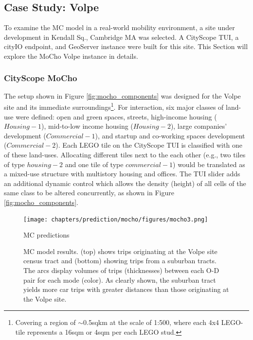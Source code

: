 {    \subsection{Case Study: Volpe}\label{subsec:mocho-volpe}
    {
        To examine the MC model in a real-world mobility environment, a site under development in Kendall Sq., Cambridge MA was selected. A CityScope TUI, a cityIO endpoint, and GeoServer instance were built for this site. This Section will explore the MoCho Volpe instance in details.

        \subsubsection{CityScope MoCho}
        {
            The setup shown in Figure \eqref{fig:mocho_components} was designed for the Volpe site and its immediate surroundings\footnote{Covering a region of $\sim$0.5sqkm at the scale of 1:500, where each 4x4 LEGO-tile represents a 16sqm or 4sqm per each LEGO stud.}. For interaction, six major classes of land-use were defined: open and green spaces, streets, high-income housing ($Housing-1$), mid-to-low income housing ($Housing-2$), large companies' development ($Commercial-1$), and startup and co-working spaces development ($Commercial-2$). Each LEGO tile on the CityScope TUI is classified with one of these land-uses.
            Allocating different tiles next to the each other (e.g., two tiles of type $housing-2$ and one tile of type $commercial-1$) would be translated as a mixed-use structure with multistory housing and offices. The TUI slider adds an additional dynamic control which allows the density (height) of all cells of the same class to be altered concurrently, as shown in Figure \eqref{fig:mocho_components}.
        }

        \begin{figure}[!htb]
            \centering
            \texttt{[image: chapters/prediction/mocho/figures/mocho3.png]}
            \caption{MC predictions}\label{fig:mocho_arcs}
            \caption*{MC model results. (top) shows trips originating at the Volpe site census tract and (bottom) showing trips from a suburban tracts. The arcs display volumes of trips (thicknesses) between each O-D pair for each mode (color). As clearly shown, the suburban tract yields more car trips with greater distances than those originating at the Volpe site.}
        \end{figure}


}}
